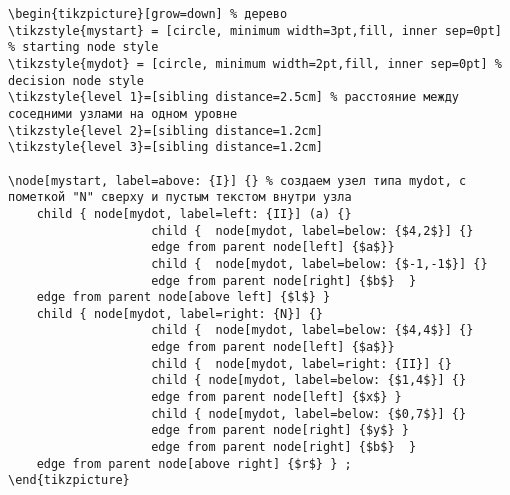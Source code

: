 \documentclass[12pt,a4paper]{article}
\begin{document}
\begin{verbatim}
\begin{tikzpicture}[grow=down] % дерево
\tikzstyle{mystart} = [circle, minimum width=3pt,fill, inner sep=0pt] % starting node style
\tikzstyle{mydot} = [circle, minimum width=2pt,fill, inner sep=0pt] % decision node style
\tikzstyle{level 1}=[sibling distance=2.5cm] % расстояние между соседними узлами на одном уровне
\tikzstyle{level 2}=[sibling distance=1.2cm]
\tikzstyle{level 3}=[sibling distance=1.2cm]

\node[mystart, label=above: {I}] {} % создаем узел типа mydot, с пометкой "N" сверху и пустым текстом внутри узла
    child { node[mydot, label=left: {II}] (a) {}
                    child {  node[mydot, label=below: {$4,2$}] {}
                    edge from parent node[left] {$a$}}
                    child {  node[mydot, label=below: {$-1,-1$}] {}
                    edge from parent node[right] {$b$}  }
    edge from parent node[above left] {$l$} }
    child { node[mydot, label=right: {N}] {}
                    child {  node[mydot, label=below: {$4,4$}] {}
                    edge from parent node[left] {$a$}}
                    child {  node[mydot, label=right: {II}] {}
                    child { node[mydot, label=below: {$1,4$}] {}
                    edge from parent node[left] {$x$} }
                    child { node[mydot, label=below: {$0,7$}] {}
                    edge from parent node[right] {$y$} }
                    edge from parent node[right] {$b$}  }
    edge from parent node[above right] {$r$} } ;
\end{tikzpicture}
        
\end{verbatim}


\newpage
{}
\end{document}
